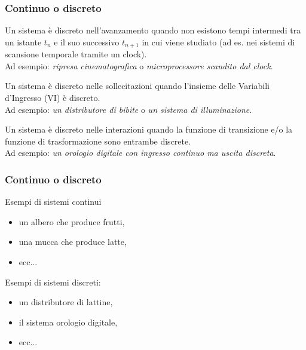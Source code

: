 \begin{frame}
	\frametitle{Continuo o discreto}
	\begin{block}{Un sistema è discreto nell'avanzamento}
		quando non esistono tempi intermedi tra un istante $t_n$ e il suo successivo $t_{n+1}$ in cui viene studiato (ad es. nei sistemi di scansione temporale tramite un clock).\\
		Ad esempio: \textit{ripresa cinematografica} o \textit{microprocessore scandito dal clock}.
	\end{block}
	
	\begin{block}{Un sistema è discreto nelle sollecitazioni}
		quando l'insieme delle Variabili d'Ingresso (VI) è discreto.\\
		Ad esempio: \textit{un distributore di bibite} o \textit{un sistema di illuminazione}.
	\end{block}
	
	\begin{block}{Un sistema è discreto nelle interazioni}
		quando la funzione di transizione e/o la funzione di trasformazione sono entrambe discrete.\\
		Ad esempio: \textit{un orologio digitale con ingresso continuo ma uscita discreta}.
	\end{block}
\end{frame}


\begin{frame}
	\frametitle{Continuo o discreto}
	\begin{block}{Esempi di sistemi continui}		
		\begin{itemize}
			\item un albero che produce frutti, 
			\item una mucca che produce latte,
			\item ecc...
		\end{itemize}
		
	\end{block}
	
	\begin{block}{Esempi di sistemi discreti:}		
		\begin{itemize}
			\item un distributore di lattine, 
			\item il sistema orologio digitale, 
			\item ecc...
		\end{itemize}
	\end{block}
	
\end{frame}


